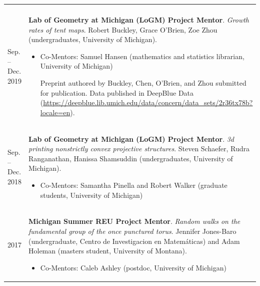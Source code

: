 \begin{center}
{\begin{longtable}{p{}  p{}}
{\begin{itemize}
        \end{itemize}
        }
        \vspace{-1em}
         \\ 
 Sep.  --  Dec.  2019 & \textbf{Lab of Geometry at Michigan (LoGM) Project Mentor}. \textit{Growth rates of tent maps}.  Robert Buckley, Grace O'Brien, Zoe Zhou (undergraduates, University of Michigan). 
        \hspace{-1em}

        {\small
        \begin{itemize}
        \setlength{\parindent}{0em}
        \item[] 
            Co-Mentors: Samuel Hansen (mathematics and statistics librarian, University of Michigan) 

            Preprint authored by Buckley, Chen, O'Brien, and Zhou submitted for publication. Data published in DeepBlue Data (\url{https://deepblue.lib.umich.edu/data/concern/data_sets/2r36tx78b?locale=en}).
            
        \end{itemize}
        }
        \vspace{-1em}
         \\ 
 Sep.  --  Dec.  2018 & \textbf{Lab of Geometry at Michigan (LoGM) Project Mentor}. \textit{3d printing nonstrictly convex projective structures}.  Steven Schaefer, Rudra Ranganathan, Hanissa Shamsuddin (undergraduates, University of Michigan). 
        \hspace{-1em}

        {\small
        \begin{itemize}
        \setlength{\parindent}{0em}
        \item[] 
            Co-Mentors: Samantha Pinella and Robert Walker (graduate students, University of Michigan) 

            
            
        \end{itemize}
        }
        \vspace{-1em}
         \\ 
   2017 & \textbf{Michigan Summer REU  Project Mentor}. \textit{Random walks on the fundamental group of the once punctured torus}.  Jennifer Jones-Baro (undergraduate, Centro de Investigacion en Matem\'aticas) and Adam Holeman (masters student, University of Montana). 
        \hspace{-1em}

        {\small
        \begin{itemize}
        \setlength{\parindent}{0em}
        \item[] 
            Co-Mentors: Caleb Ashley (postdoc, University of Michigan) 

            
            
        \end{itemize}
        }
        \vspace{-1em}
         
    \end{longtable}
    } 
    \end{center}

